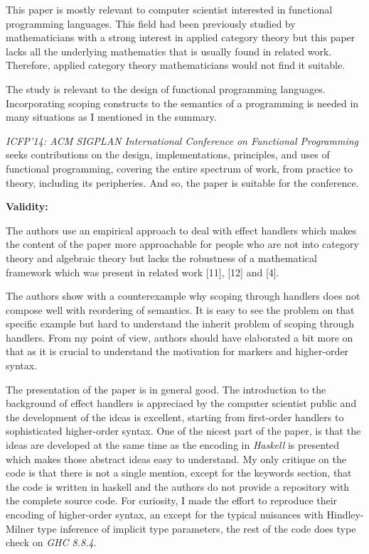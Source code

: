 \documentclass[12pt, a4paper]{article}
\begin{document}
This paper is mostly relevant to computer scientist interested in functional programming languages. This field had been previously studied by mathematicians with a strong interest in applied category theory but this paper lacks all the underlying mathematics that is usually found in related work. Therefore, applied category theory mathematicians would not find it suitable.

The study is relevant to the design of functional programming languages. Incorporating scoping constructs to the semantics of a programming is needed in many situations as I mentioned in the summary.

\textit{ICFP'14: ACM SIGPLAN International Conference on Functional Programming} seeks contributions on the design, implementations, principles, and uses of functional programming, covering the entire spectrum of work, from practice to theory, including its peripheries. And so, the paper is suitable for the conference.


\vspace{2ex}
{\normalsize \textbf{Validity:}}

The authors use an empirical approach to deal with effect handlers which makes the content of the paper more approachable for people who are not into category theory and algebraic theory but lacks the robustness of a mathematical framework which was present in related work [11], [12] and [4].

The authors show with a counterexample why scoping through handlers does not compose well with reordering of semantics. It is easy to see the problem on that specific example but hard to understand the inherit problem of scoping through handlers. From my point of view, authors should have elaborated a bit more on that as it is crucial to understand the motivation for markers and higher-order syntax.

The presentation of the paper is in general good. The introduction to the background of effect handlers is appreciaed by the computer scientist public and the development of the ideas is excellent, starting from first-order handlers to sophisticated higher-order syntax. One of the nicest part of the paper, is that the ideas are developed at the same time as the encoding in \textit{Haskell} is presented which makes those abstract ideas easy to understand. My only critique on the code is that there is not a single mention, except for the keywords section, that the code is written in haskell and the authors do not provide a repository with the complete source code. For curiosity, I made the effort to reproduce their encoding of higher-order syntax, an except for the typical nuisances with Hindley-Milner type inference of implicit type parameters, the rest of the code does type check on \textit{GHC 8.8.4}.
\end{document}
